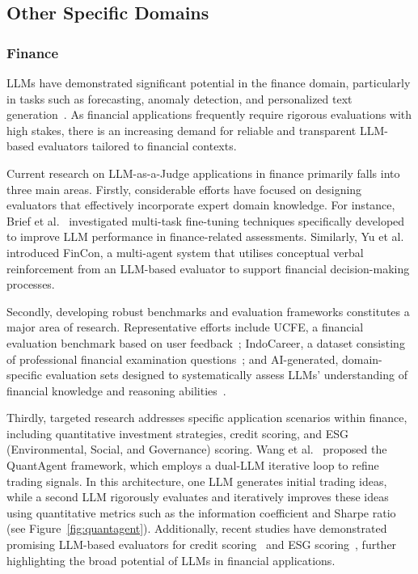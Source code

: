 \documentclass[acmsmall,screen]{acmart}
\begin{document}
\subsection{Other Specific Domains}
\subsubsection{\textbf{Finance}}

LLMs have demonstrated significant potential in the finance domain, particularly in tasks such as forecasting, anomaly detection, and personalized text generation~\cite{zhao2024revolutionizing}. As financial applications frequently require rigorous evaluations with high stakes, there is an increasing demand for reliable and transparent LLM-based evaluators tailored to financial contexts.

Current research on LLM-as-a-Judge applications in finance primarily falls into three main areas. Firstly, considerable efforts have focused on designing evaluators that effectively incorporate expert domain knowledge. For instance, Brief et al.~\cite{brief2024mixing} investigated multi-task fine-tuning techniques specifically developed to improve LLM performance in finance-related assessments. Similarly, Yu et al.~\cite{yu2024fincon} introduced FinCon, a multi-agent system that utilises conceptual verbal reinforcement from an LLM-based evaluator to support financial decision-making processes.

Secondly, developing robust benchmarks and evaluation frameworks constitutes a major area of research. Representative efforts include UCFE, a financial evaluation benchmark based on user feedback~\cite{yang2024ucfe}; IndoCareer, a dataset consisting of professional financial examination questions~\cite{koto2024cracking}; and AI-generated, domain-specific evaluation sets designed to systematically assess LLMs’ understanding of financial knowledge and reasoning abilities~\cite{raju2024constructing}.

Thirdly, targeted research addresses specific application scenarios within finance, including quantitative investment strategies, credit scoring, and ESG (Environmental, Social, and Governance) scoring. Wang et al.~\cite{wang_quantagent_2024} proposed the QuantAgent framework, which employs a dual-LLM iterative loop to refine trading signals. In this architecture, one LLM generates initial trading ideas, while a second LLM rigorously evaluates and iteratively improves these ideas using quantitative metrics such as the information coefficient and Sharpe ratio (see Figure~\ref{fig:quantagent}). 
Additionally, recent studies have demonstrated promising LLM-based evaluators for credit scoring~\cite{yoon2023design,babaei2024gpt} and ESG scoring~\cite{zhao2024revolutionizing}, further highlighting the broad potential of LLMs in financial applications.
\end{document}
